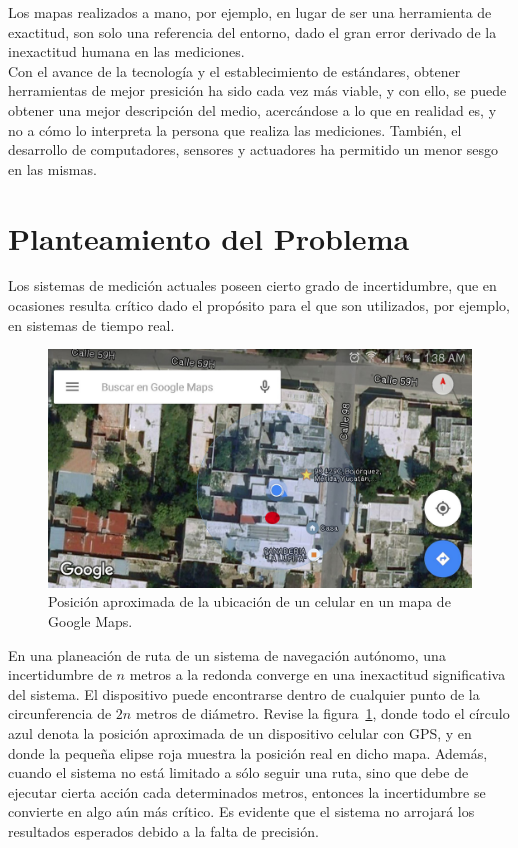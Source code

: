 Los mapas realizados a mano, por ejemplo, en lugar de ser una herramienta de exactitud, son solo una referencia del entorno, dado el gran error derivado de la inexactitud humana en las mediciones. \\

Con el avance de la tecnología y el establecimiento de estándares, obtener herramientas de mejor presición ha sido cada vez más viable, y con ello, se puede obtener una mejor descripción del medio, acercándose a lo que en realidad es, y no a cómo lo interpreta la persona que realiza las mediciones. También, el desarrollo de computadores, sensores y actuadores ha permitido un menor sesgo en las mismas. 

\section{Planteamiento del Problema}
Los sistemas de medición actuales poseen cierto grado de incertidumbre, que en ocasiones resulta crítico dado el propósito para el que son utilizados, por ejemplo, en sistemas de tiempo real. \\

\begin{figure}[ht]
\centering
\includegraphics[scale=0.14]{Figures/Pred}
\caption[Posición de celular en mapa.]{Posición aproximada de la ubicación de un celular en un mapa de Google Maps.}
\label{fig:Prec}
\end{figure}

En una planeación de ruta de un sistema de navegación autónomo, una incertidumbre de $n$ metros a la redonda converge en una inexactitud significativa del sistema. El dispositivo puede encontrarse dentro de cualquier punto de la circunferencia de $2n$ metros de diámetro. Revise la figura~\ref{fig:Prec}, donde todo el círculo azul denota la posición aproximada de un dispositivo celular con GPS, y en donde la pequeña elipse roja muestra la posición real en dicho mapa. Además, cuando el sistema no está limitado a sólo seguir una ruta, sino que debe de ejecutar cierta acción cada determinados metros, entonces la incertidumbre se convierte en algo aún más crítico. Es evidente que el sistema no arrojará los resultados esperados debido a la falta de precisión.

